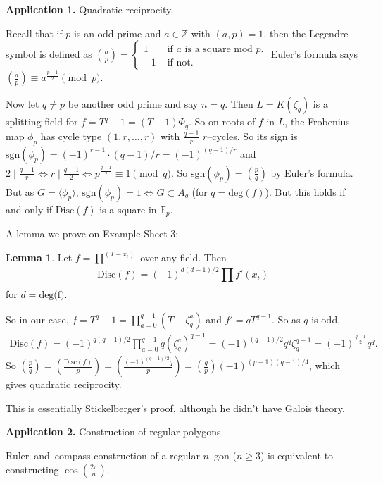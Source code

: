 \documentclass{article}
\theoremstyle{definition}
\newtheorem{lemma}[theorem]{Lemma}
\begin{document}
\textbf{Application 1.} Quadratic reciprocity.

Recall that if $p$ is an odd prime and $a \in \mathbb{Z}$ with $(a,p)=1$, then the Legendre symbol is defined as $\left( \frac{a}{p} \right) = \begin{cases}
    1 &\text{ if } a \text{ is a square mod }p.\\
    -1 &\text{ if not.}
\end{cases}$ Euler's formula says $\left( \frac{a}{p} \right) \equiv a^{\frac{p-1}{2}} \pmod{p}$.

Now let $q \neq p$ be another odd prime and say $n=q$. Then $L=K(\zeta_q)$ is a splitting field for $f=T^q-1 = (T-1)\Phi_q$. So on roots of $f$ in $L$, the Frobenius map $\phi_p$ has cycle type $(1,r,\ldots,r)$ with $\frac{q-1}{r}$ $r$--cycles. So its sign is $\text{sgn}(\phi_p) = (-1)^{r-1}\cdot (q-1)/r = (-1)^{(q-1)/r}$ and $2 \mid \frac{q-1}{r} \iff r \mid \frac{q-1}{2} \iff p^{\frac{q-1}{2}} \equiv 1 \pmod{q}$. So $\text{sgn}(\phi_p) = \left( \frac{p}{q} \right)$ by Euler's formula. But as $G = \langle \phi_p \rangle$, $\text{sgn}(\phi_p) = 1 \iff G \subset A_q$ (for $q=\text{deg}(f)$). But this holds if and only if $\text{Disc}(f)$ is a square in $\mathbb{F}_p$.

A lemma we prove on Example Sheet 3:
\begin{lemma}
    Let $f=\prod_{}^{(T-x_i)}$ over any field. Then $$\text{Disc}(f)= (-1)^{d(d-1)/2}\prod_{}^{} f'(x_i)$$ for $d=\text{deg(f)}$.
\end{lemma}

So in our case, $f=T^q-1 = \prod_{a=0}^{q-1} (T-\zeta_q^a)$ and $f'=qT^{q-1}$. So as $q$ is odd, 
\begin{align*}
    \text{Disc}(f) = (-1)^{q(q-1)/2} \prod_{a=0}^{q-1} q (\zeta_q^a)^{q-1} = (-1)^{(q-1)/2}q^q \zeta_q^{q-1} = (-1)^{\frac{q-1}{2}}q^q.
\end{align*}
So $\left( \frac{p}{q} \right)  = \left( \frac{\text{Disc}(f)}{p} \right) =\left( \frac{(-1)^{(q-1)/2}q}{p} \right) = \left( \frac{q}{p} \right) (-1)^{(p-1)(q-1)/4}$, which gives quadratic reciprocity.

This is essentially Stickelberger's proof, although he didn't have Galois theory.
\vspace{1mm}

\textbf{Application 2.} Construction of regular polygons.

Ruler--and--compass construction of a regular $n$--gon ($n\ge 3$) is equivalent to constructing $\cos(\frac{2\pi}{n})$.
\end{document}
